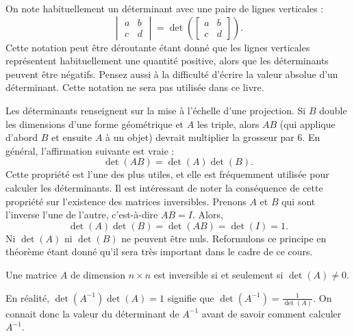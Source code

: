 On note habituellement un déterminant avec une paire de lignes verticales :
\begin{equation*}
\begin{vmatrix}
a & b \\
c & d
\end{vmatrix}
=
\det \left(
\begin{bmatrix}
a & b \\
c & d
\end{bmatrix}
\right) .
\end{equation*}
Cette notation peut être déroutante étant donné que les lignes verticales représentent habituellement une quantité positive, alors que les déterminants peuvent être négatifs. Pensez aussi à la difficulté d’écrire la valeur absolue d’un déterminant. Cette notation ne sera pas utilisée dans ce livre.

\medskip

Les déterminants renseignent sur la mise à l’échelle d’une projection. Si $B$ double les dimensions d’une forme géométrique et $A$ les triple, alors $AB$ (qui applique d’abord $B$ et ensuite $A$ à un objet) devrait multiplier la grosseur par $6$.  En général, l’affirmation suivante est vraie :
\begin{equation*}
\det(AB) = \det(A)\det(B) .
\end{equation*}
Cette propriété est l'une des plus utiles, et elle est fréquemment utilisée pour calculer les déterminants. Il est intéressant de noter la conséquence de cette propriété sur l’existence des matrices inversibles. Prenons $A$ et $B$ qui sont l’inverse l’une de l’autre, c’est-à-dire $AB=I$.  Alors,
\begin{equation*}
\det(A)\det(B) = \det(AB) = \det(I) = 1 .
\end{equation*}
Ni $\det(A)$ ni $\det(B)$ ne peuvent être nuls. Reformulons ce principe en théorème étant donné qu’il sera très important dans le cadre de ce cours.

\begin{theorem}
Une matrice $A$ de dimension $n \times n$ est inversible si et seulement si $\det (A) \not= 0$.
\end{theorem}

En réalité, $\det(A^{-1}) \det(A) = 1$ signifie que $\det(A^{-1}) =
\frac{1}{\det(A)}$. On connait donc la valeur du déterminant de $A^{-1}$ avant de savoir comment calculer $A^{-1}$.

